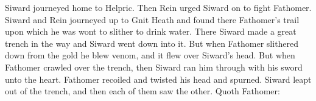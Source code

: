\bpb Siward journeyed home to Helpric. Then Rein urged Siward on to fight Fathomer. Siward and Rein journeyed up to Gnit Heath and found there Fathomer’s trail upon which he was wont to slither to drink water. There Siward made a great trench in the way and Siward went down into it. But when Fathomer slithered down from the gold he blew venom, and it flew over Siward’s head. But when Fathomer crawled over the trench, then Siward ran him through with his sword unto the heart. Fathomer recoiled and twisted his head and spurned. Siward leapt out of the trench, and then each of them saw the other. Quoth Fathomer:\epb\epg
